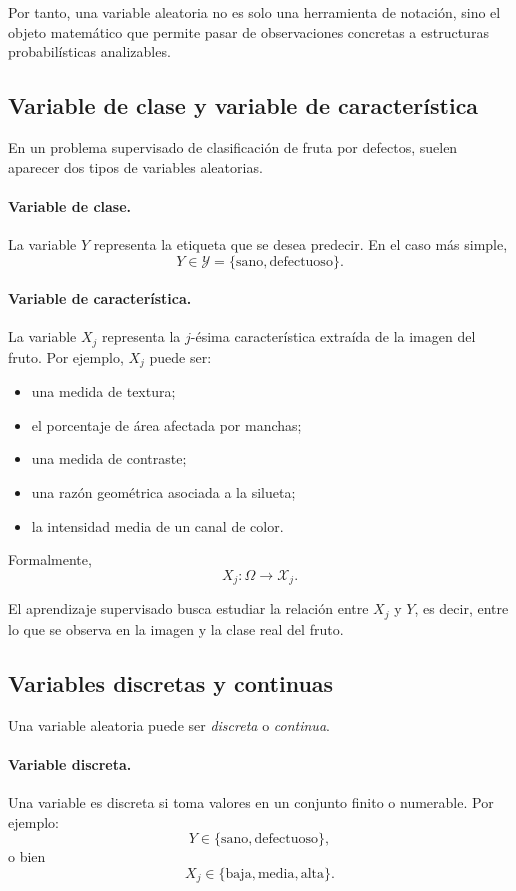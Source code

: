 \documentclass{article}
\begin{document}
Por tanto, una variable aleatoria no es solo una herramienta de notación, sino el objeto matemático que permite pasar de observaciones concretas a estructuras probabilísticas analizables.
\subsection{Variable de clase y variable de característica}

En un problema supervisado de clasificación de fruta por defectos, suelen aparecer dos tipos de variables aleatorias.

\paragraph{Variable de clase.}
La variable \(Y\) representa la etiqueta que se desea predecir. En el caso más simple,
\[
Y\in\mathcal{Y}=\{\text{sano},\text{defectuoso}\}.
\]

\paragraph{Variable de característica.}
La variable \(X_j\) representa la \(j\)-ésima característica extraída de la imagen del fruto. Por ejemplo, \(X_j\) puede ser:

\begin{itemize}
\item una medida de textura;
\item el porcentaje de área afectada por manchas;
\item una medida de contraste;
\item una razón geométrica asociada a la silueta;
\item la intensidad media de un canal de color.
\end{itemize}

Formalmente,
\[
X_j:\Omega \to \mathcal{X}_j.
\]

El aprendizaje supervisado busca estudiar la relación entre \(X_j\) y \(Y\), es decir, entre lo que se observa en la imagen y la clase real del fruto.

\subsection{Variables discretas y continuas}

Una variable aleatoria puede ser \textit{discreta} o \textit{continua}.

\paragraph{Variable discreta.}
Una variable es discreta si toma valores en un conjunto finito o numerable. Por ejemplo:
\[
Y\in\{\text{sano},\text{defectuoso}\},
\]
o bien
\[
X_j\in\{\text{baja},\text{media},\text{alta}\}.
\]
\end{document}
